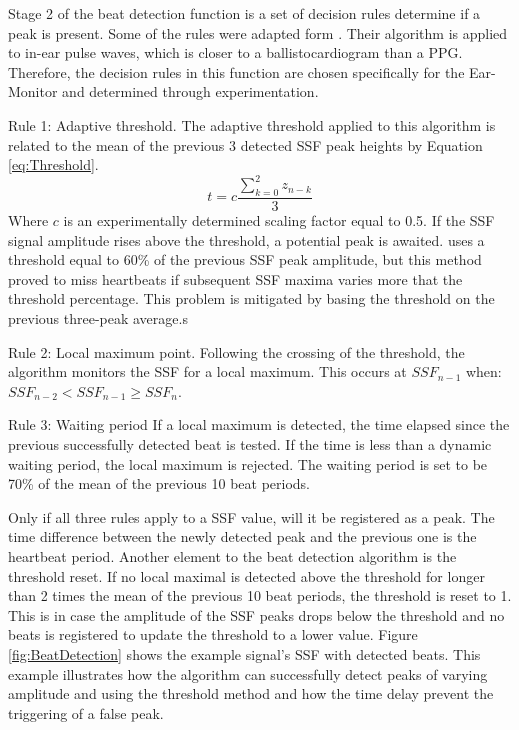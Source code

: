 Stage 2 of the beat detection function is a set of decision rules determine if a peak is present. Some of the rules were adapted form \cite{park2015wearable}. Their algorithm is applied to in-ear pulse waves, which is closer to a ballistocardiogram than a PPG. Therefore, the decision rules in this function are chosen specifically for the Ear-Monitor and determined through experimentation.

\medskip

Rule 1: Adaptive threshold. The adaptive threshold applied to this algorithm is related to the mean of the previous 3 detected SSF peak heights by Equation \ref{eq:Threshold}.
\begin{equation}
\label{eq:Threshold}
t=c\frac{\sum\nolimits_{k=0}^2 z_{n-k}}{3}
\end{equation}
Where $c$ is an experimentally determined scaling factor equal to 0.5. If the SSF signal amplitude rises above the threshold, a potential peak is awaited. \cite{zong2003open} uses a threshold equal to 60\% of the previous SSF peak amplitude, but this method proved to miss heartbeats if subsequent SSF maxima varies more that the threshold percentage. This problem is mitigated by basing the threshold on the previous three-peak average.s

\medskip

Rule 2: Local maximum point. Following the crossing of the threshold, the algorithm monitors the SSF for a local maximum. This occurs at $SSF_{n-1}$ when: $SSF_{n-2} < SSF_{n-1} \ge SSF_n$.

\medskip

Rule 3: Waiting period
If a local maximum is detected, the time elapsed since the previous successfully detected beat is tested. If the time is less than a dynamic waiting period, the local maximum is rejected. The waiting period is set to be 70\% of the mean of the previous 10 beat periods.

\medskip

Only if all three rules apply to a SSF value, will it be registered as a peak. The time difference between the newly detected peak and the previous one is the heartbeat period. Another element to the beat detection algorithm is the threshold reset. If no local maximal is detected above the threshold for longer than 2 times the mean of the previous 10 beat periods, the threshold is reset to 1. This is in case the amplitude of the SSF peaks drops below the threshold and no beats is registered to update the threshold to a lower value. Figure \ref{fig:BeatDetection} shows the example signal's SSF with detected beats. This example illustrates how the algorithm can successfully detect peaks of varying amplitude and using the threshold method and how the time delay prevent the triggering of a false peak.

